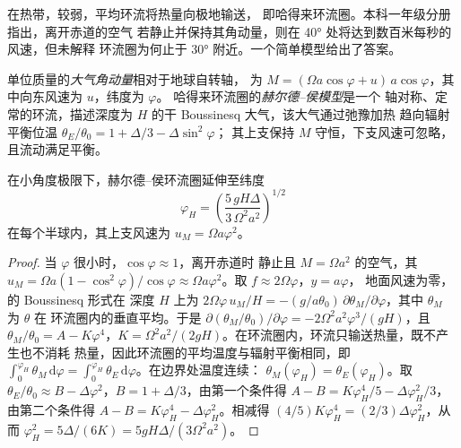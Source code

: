 在热带，较弱，平均环流将热量向极地输送，
即哈得来环流圈。本科一年级分册指出，离开赤道的空气
若静止并保持其角动量，则在
\ang{40} 处将达到数百米每秒的风速，但未解释
环流圈为何止于 \ang{30} 附近。一个简单模型给出了答案。

\begin{definition}\label{def:b3:atmospheric-dynamics:held-hou}
单位质量的\emph{大气角动量}相对于地球自转轴，
为 $M = (\Omega a\cos\varphi +
u)\,a\cos\varphi$，其中向东风速为 $u$，纬度为 $\varphi$。
哈得来环流圈的\emph{赫尔德–侯模型}是一个
轴对称、定常的环流，描述深度为
$H$ 的干 Boussinesq 大气，该大气通过弛豫加热
趋向辐射平衡位温 $\theta_E/\theta_0 = 1 + \Delta/3 - \Delta\sin^2\varphi$；
其上支保持 $M$ 守恒，下支风速可忽略，
且流动满足平衡。
\end{definition}

\begin{theorem}[哈得来环流圈的范围]\label{thm:b3:atmospheric-dynamics:held-hou}
在小角度极限下，赫尔德–侯环流圈延伸至纬度
\[
\varphi_H = \left(\frac{5\,gH\Delta}{3\,\Omega^2a^2}\right)^{1/2}
\]
在每个半球内，其上支风速为 $u_M = \Omega
a\varphi^2$。
\end{theorem}

\begin{proof}
当 $\varphi$ 很小时，$\cos\varphi \approx 1$，离开赤道时
静止且 $M = \Omega a^2$ 的空气，其 $u_M = \Omega a(1 - \cos^2\varphi)/\cos\varphi
\approx \Omega a\varphi^2$。取 $f \approx 2\Omega\varphi$，$y = a\varphi$，
地面风速为零，的 Boussinesq 形式在
深度 $H$ 上为 $2\Omega\varphi\,u_M/H = -(g/a\theta_0)\,\partial\theta_M/
\partial\varphi$，其中 $\theta_M$ 为 $\theta$ 在
环流圈内的垂直平均。于是 $\partial(\theta_M/\theta_0)/\partial\varphi = -2\Omega^2a^2
\varphi^3/(gH)$，且 $\theta_M/\theta_0 = A - K\varphi^4$，$K = \Omega^2a^2/
(2gH)$。在环流圈内，环流只输送热量，既不产生也不消耗
热量，因此环流圈的平均温度与辐射平衡相同，即
$\int_0^{\varphi_H}\theta_M\,\mathrm d\varphi = \int_0^{\varphi_H}
\theta_E\,\mathrm d\varphi$。在边界处温度连续：
$\theta_M(\varphi_H) = \theta_E(\varphi_H)$。取 $\theta_E/\theta_0 \approx
B - \Delta\varphi^2$，$B = 1 + \Delta/3$，由第一个条件得 $A - B =
K\varphi_H^4/5 - \Delta\varphi_H^2/3$，由第二个条件得 $A - B = K\varphi_H^4 -
\Delta\varphi_H^2$。相减得 $(4/5)K\varphi_H^4 = (2/3)\Delta
\varphi_H^2$，从而 $\varphi_H^2 = 5\Delta/(6K) = 5gH\Delta/(3\Omega^2a^2)$。
\end{proof}

